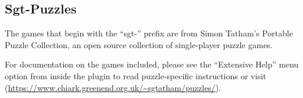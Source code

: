 \subsection{Sgt-Puzzles}

The games that begin with the ``sgt-'' prefix are from Simon Tatham's
Portable Puzzle Collection, an open source collection of single-player
puzzle games.

For documentation on the games included, please see the ``Extensive
Help'' menu option from inside the plugin to read puzzle-specific
instructions or visit
(\url{https://www.chiark.greenend.org.uk/~sgtatham/puzzles/}).
